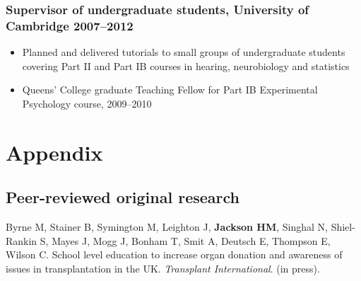 \documentclass[a4paper, oneside, final, 11pt]{scrartcl} %
\begin{document}
\smallskip 

\subsubsection*{Supervisor of undergraduate students, University of Cambridge \hfill 2007--2012} 
\normalfont
\begin{itemize}
	\item Planned and delivered tutorials to small groups of undergraduate students covering Part II and Part IB courses in hearing, neurobiology and statistics
	\item Queens' College graduate Teaching Fellow for Part IB Experimental Psychology course, 2009--2010
\end{itemize}

\medskip




\newpage

\section{Appendix}

\subsection*{Peer-reviewed original research}

Byrne M, Stainer B, Symington M, Leighton J, \textbf{Jackson HM}, Singhal N, Shiel-Rankin S, Mayes J, Mogg J, Bonham T, Smit A, Deutsch E, Thompson E, Wilson C. School level education to increase organ donation and awareness of issues in transplantation in the UK. \textit{Transplant International}. (in press).

\bigskip
\end{document}

